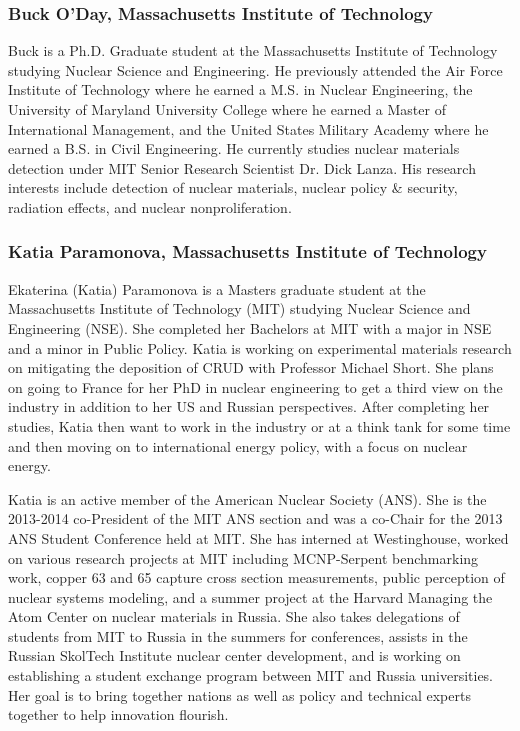 \subsubsection*{Buck O'Day, Massachusetts Institute of Technology}

Buck is a Ph.D. Graduate student at the Massachusetts Institute of Technology
studying Nuclear Science and Engineering. He previously attended the Air Force
Institute of Technology where he earned a M.S. in Nuclear Engineering, the
University of Maryland University College where he earned a Master of
International Management, and the United States Military Academy where he earned
a B.S. in Civil Engineering. He currently studies nuclear materials detection
under MIT Senior Research Scientist Dr. Dick Lanza. His research interests
include detection of nuclear materials, nuclear policy \& security, radiation
effects, and nuclear nonproliferation.

\subsubsection*{Katia Paramonova, Massachusetts Institute of Technology}

Ekaterina (Katia) Paramonova is a Masters graduate student at the Massachusetts
Institute of Technology (MIT) studying Nuclear Science and Engineering
(NSE). She completed her Bachelors at MIT with a major in NSE and a minor in
Public Policy. Katia is working on experimental materials research on mitigating
the deposition of CRUD with Professor Michael Short. She plans on going to
France for her PhD in nuclear engineering to get a third view on the industry in
addition to her US and Russian perspectives. After completing her studies, Katia
then want to work in the industry or at a think tank for some time and then
moving on to international energy policy, with a focus on nuclear energy.

Katia is an active member of the American Nuclear Society (ANS). She is the
2013-2014 co-President of the MIT ANS section and was a co-Chair for the 2013
ANS Student Conference held at MIT. She has interned at Westinghouse, worked on
various research projects at MIT including MCNP-Serpent benchmarking work,
copper 63 and 65 capture cross section measurements, public perception of
nuclear systems modeling, and a summer project at the Harvard Managing the Atom
Center on nuclear materials in Russia. She also takes delegations of students
from MIT to Russia in the summers for conferences, assists in the Russian
SkolTech Institute nuclear center development, and is working on establishing a
student exchange program between MIT and Russia universities. Her goal is to
bring together nations as well as policy and technical experts together to help
innovation flourish.

